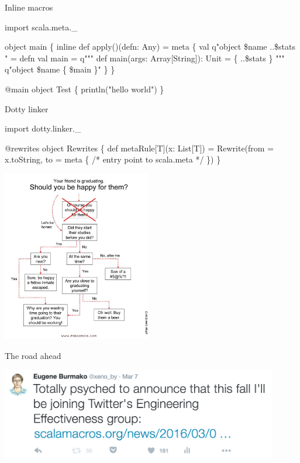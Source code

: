 \documentclass[svgnames,dvipsnames,hyperref={bookmarks=false},usepdftitle=false]{beamer}
\begin{document}
\begin{frame}[fragile]{Inline macros}
\begin{semiverbatim}
import scala.meta._

object main \{
  inline def apply()(defn: Any) = meta \{
    val q"object \$name { ..\$stats }" = defn
    val main = q"""
      def main(args: Array[String]): Unit = \{ ..\$stats \}
    """
    q"object \$name \{ \$main \}"
  \}
\}

@main object Test \{
  println("hello world")
\}
\end{semiverbatim}
\end{frame}

\begin{frame}[fragile]{Dotty linker}
\begin{semiverbatim}
import dotty.linker._

@rewrites
object Rewrites \{
  def metaRule[T](x: List[T]) =
    Rewrite(from = x.toString,
              to = meta \{ /* entry point to scala.meta */ \})
\}
\end{semiverbatim}
\end{frame}

\begin{frame}[c, fragile]{}
\begin{center}
\includegraphics[height=7.5cm]{YourFriendIsGraduating.jpg}\\
\end{center}
\end{frame}

\begin{frame}{The road ahead}
\vskip20pt
\begin{center}
\includegraphics[height=4cm]{twitter.png}
\end{center}
\end{frame}
\end{document}
